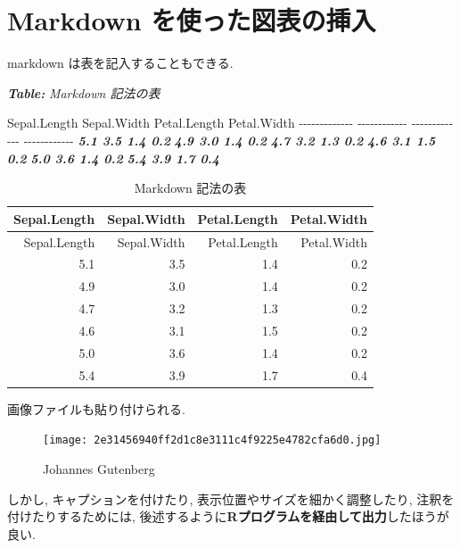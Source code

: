 \documentclass[
]{bxjsbook}
\newenvironment{Shaded}{\begin{snugshade}}{\end{snugshade}}
\newcommand{\AnnotationTok}[1]{\textcolor[rgb]{0.56,0.35,0.01}{\textbf{\textit{#1}}}}
\newcommand{\CommentTok}[1]{\textcolor[rgb]{0.56,0.35,0.01}{\textit{#1}}}
\newcommand{\InformationTok}[1]{\textcolor[rgb]{0.56,0.35,0.01}{\textbf{\textit{#1}}}}
\newcommand{\NormalTok}[1]{#1}
\theoremstyle{definition}
\theoremstyle{definition}
\theoremstyle{definition}
\theoremstyle{remark}
\begin{document}
\hypertarget{markdown-ux3092ux4f7fux3063ux305fux56f3ux8868ux306eux633fux5165}{%
\section{Markdown
を使った図表の挿入}\label{markdown-ux3092ux4f7fux3063ux305fux56f3ux8868ux306eux633fux5165}}

markdown は表を記入することもできる.

\begin{Shaded}
\begin{Highlighting}[]
\AnnotationTok{Table:}\CommentTok{ Markdown 記法の表}

\NormalTok{ Sepal.Length   Sepal.Width   Petal.Length   Petal.Width}
\NormalTok{{-}{-}{-}{-}{-}{-}{-}{-}{-}{-}{-}{-}{-}  {-}{-}{-}{-}{-}{-}{-}{-}{-}{-}{-}{-}  {-}{-}{-}{-}{-}{-}{-}{-}{-}{-}{-}{-}{-}  {-}{-}{-}{-}{-}{-}{-}{-}{-}{-}{-}{-}}
\InformationTok{          5.1           3.5            1.4           0.2}
\InformationTok{          4.9           3.0            1.4           0.2}
\InformationTok{          4.7           3.2            1.3           0.2}
\InformationTok{          4.6           3.1            1.5           0.2}
\InformationTok{          5.0           3.6            1.4           0.2}
\InformationTok{          5.4           3.9            1.7           0.4}
\end{Highlighting}
\end{Shaded}

\begin{longtable}[]{@{}rrrr@{}}
\caption{Markdown 記法の表}\tabularnewline
\toprule
Sepal.Length & Sepal.Width & Petal.Length & Petal.Width\tabularnewline
\midrule
\endfirsthead
\toprule
Sepal.Length & Sepal.Width & Petal.Length & Petal.Width\tabularnewline
\midrule
\endhead
5.1 & 3.5 & 1.4 & 0.2\tabularnewline
4.9 & 3.0 & 1.4 & 0.2\tabularnewline
4.7 & 3.2 & 1.3 & 0.2\tabularnewline
4.6 & 3.1 & 1.5 & 0.2\tabularnewline
5.0 & 3.6 & 1.4 & 0.2\tabularnewline
5.4 & 3.9 & 1.7 & 0.4\tabularnewline
\bottomrule
\end{longtable}

画像ファイルも貼り付けられる.

\begin{figure}
\centering
\texttt{[image: 2e31456940ff2d1c8e3111c4f9225e4782cfa6d0.jpg]}
\caption{Johannes Gutenberg}
\end{figure}

しかし, キャプションを付けたり, 表示位置やサイズを細かく調整したり,
注釈を付けたりするためには,
後述するように\textbf{Rプログラムを経由して出力}したほうが良い.
\end{document}
